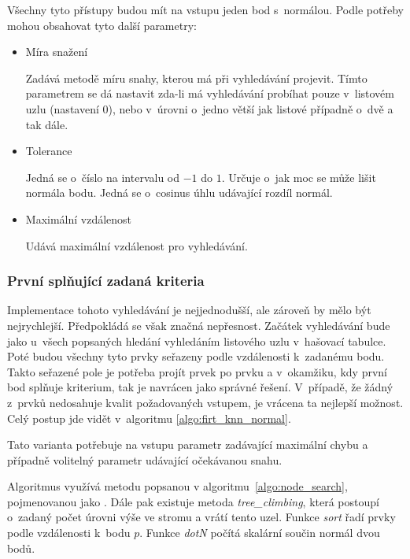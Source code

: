 Všechny tyto přístupy budou mít na vstupu jeden bod s~normálou. Podle potřeby mohou obsahovat tyto další parametry:
\begin{itemize}
    \item Míra snažení

    
    Zadává metodě míru snahy, kterou má při vyhledávání projevit. Tímto parametrem se dá nastavit zda-li má vyhledávání probíhat pouze v~listovém uzlu (nastavení $0$), nebo v~úrovni o~jedno větší jak listové případně o~dvě a tak dále.
    \item Tolerance
    
    Jedná se o~číslo na intervalu od $-1$ do $1$. Určuje o~jak moc se může lišit normála bodu. Jedná se o~cosinus úhlu udávající rozdíl normál. 
    \item Maximální vzdálenost
    
    Udává maximální vzdálenost pro vyhledávání.
\end{itemize}

\subsubsection{První splňující zadaná kriteria}
Implementace tohoto vyhledávání je nejjednodušší, ale zároveň by mělo být nejrychlejší. Předpokládá se však značná nepřesnost. Začátek vyhledávání bude jako u~všech popsaných hledání vyhledáním listového uzlu v~hašovací tabulce. Poté budou všechny tyto prvky seřazeny podle vzdálenosti k~zadanému bodu. Takto seřazené pole je potřeba projít prvek po prvku a v~okamžiku, kdy první bod splňuje kriterium, tak je navrácen jako správné řešení. V~případě, že žádný z~prvků nedosahuje kvalit požadovaných vstupem, je vrácena ta nejlepší možnost. Celý postup jde vidět v~algoritmu \ref{algo:firt_knn_normal}.

Tato varianta potřebuje na vstupu parametr zadávající maximální chybu a případně volitelný parametr udávající očekávanou snahu.

Algoritmus využívá metodu popsanou v algoritmu~\ref{algo:node_search}, pojmenovanou jako . Dále pak existuje metoda \emph{tree\_climbing}, která postoupí o~zadaný počet úrovni výše ve stromu a vrátí tento uzel. Funkce \emph{sort} řadí prvky podle vzdálenosti k~bodu $p$. Funkce \emph{dotN} počítá skalární součin normál dvou bodů.


